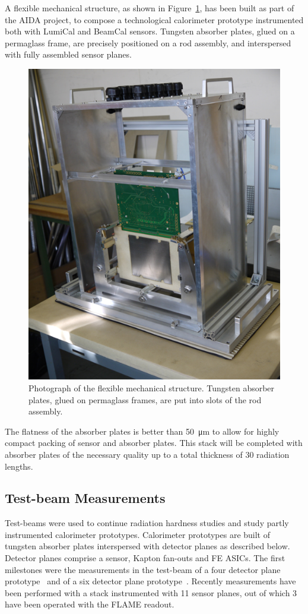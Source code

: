 A flexible mechanical structure, as shown in Figure~\ref{fig:mechanical_structure}, has been 
built as part of the AIDA project,
to compose a technological 
calorimeter prototype instrumented both with LumiCal and BeamCal sensors. 
Tungsten absorber plates, glued on a permaglass
frame, are precisely
positioned on a rod assembly, and interspersed with fully assembled sensor planes.
\begin{figure}
    \centering
    \includegraphics[width=0.6\columnwidth,]{Calorimeter/FCAL/figs/mechanical_structure_2}
    \caption{Photograph of the flexible mechanical structure. Tungsten absorber plates, glued on permaglass frames, are put into slots of the
rod assembly.}
    \label{fig:mechanical_structure}
\end{figure}
The flatness of the absorber plates is better than \SI{50}{\micro\meter} to allow for highly compact 
packing of sensor and absorber plates. This stack will be completed 
with absorber plates of the necessary quality up to a total thickness of 30 radiation lengths.

\subsection{Test-beam Measurements}

Test-beams were used to continue radiation hardness studies and study partly instrumented calorimeter prototypes. 
Calorimeter prototypes are built of tungsten absorber plates interspersed with detector  planes as described below. Detector planes comprise a sensor, Kapton fan-outs and FE ASICs.
The first milestones were the measurements in the test-beam of a four
detector plane prototype~\cite{Abramowicz:2017cer} and of a six detector plane prototype~\cite{Abramowicz:2018vwb}. 
Recently measurements have been performed with a stack instrumented with 11 sensor planes, out of which 3 have been operated with the FLAME readout.   

